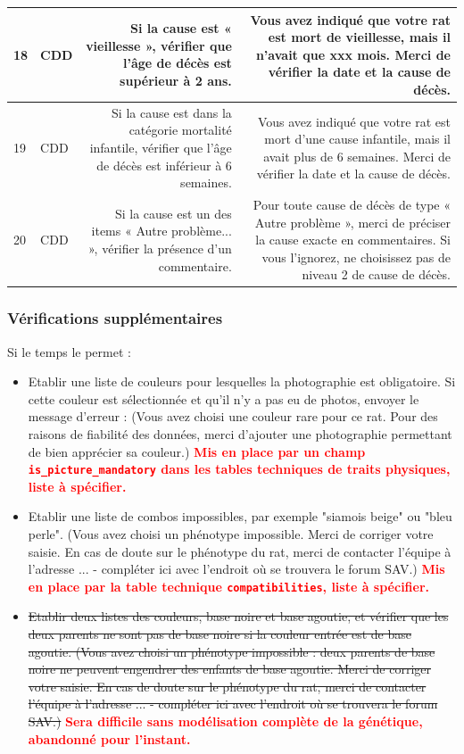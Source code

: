 \documentclass[a4paper,10pt]{article}
\newcommand\desire[1]{\noindent\textbf{\textcolor{red}{#1}}}
\begin{document}
\begin{tabularx}{\textwidth}{|l|l|R|R|}
18 & CDD & Si la cause est « vieillesse », vérifier que l'âge de décès est supérieur à 2 ans. & Vous avez indiqué que votre rat est mort de vieillesse, mais il n'avait que xxx mois. Merci de vérifier la date et la cause de décès.\\\hline


19 & CDD & Si la cause est dans la catégorie mortalité infantile, vérifier que l'âge de décès est inférieur à 6 semaines. & Vous avez indiqué que votre rat est mort d'une cause infantile, mais il avait plus de 6 semaines. Merci de vérifier la date et la cause de décès.\\\hline


20 & CDD & Si la cause est un des items « Autre problème... », vérifier la présence d'un commentaire. & Pour toute cause de décès de type « Autre problème », merci de préciser la cause exacte en commentaires. Si vous l'ignorez, ne choisissez pas de niveau 2 de cause de décès.\\\hline

\end{tabularx}
\normalsize

\subsubsection{Vérifications supplémentaires}

Si le temps le permet : 

\begin{itemize}
\item Etablir une liste de couleurs pour lesquelles la photographie est obligatoire. Si cette couleur est sélectionnée et qu'il n'y a pas eu de photos, envoyer le message d'erreur : (Vous avez choisi une couleur rare pour ce rat. Pour des raisons de fiabilité des données, merci d'ajouter une photographie permettant de bien apprécier sa couleur.) \desire{Mis en place par un champ \texttt{is\_picture\_mandatory} dans les tables techniques de traits physiques, liste à spécifier.}
\item Etablir une liste de combos impossibles, par exemple "siamois beige" ou "bleu perle". (Vous avez choisi un phénotype impossible. Merci de corriger votre saisie. En cas de doute sur le phénotype du rat, merci de contacter l'équipe à l'adresse ... - compléter ici avec l'endroit où se trouvera le forum SAV.) \desire{Mis en place par la table technique \texttt{compatibilities}, liste à spécifier.}
\item \sout{Etablir deux listes des couleurs, base noire et base agoutie, et vérifier que les deux parents ne sont pas de base noire si la couleur entrée est de base agoutie. (Vous avez choisi un phénotype impossible : deux parents de base noire ne peuvent engendrer des enfants de base agoutie. Merci de corriger votre saisie. En cas de doute sur le phénotype du rat, merci de contacter l'équipe à l'adresse ... - compléter ici avec l'endroit où se trouvera le forum SAV.)} \desire{Sera difficile sans modélisation complète de la génétique, abandonné pour l'instant.}
\end{itemize}
\end{document}
